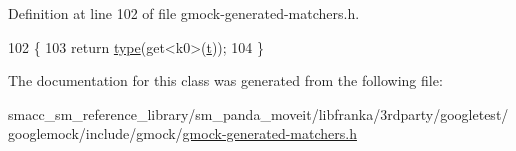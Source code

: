 Definition at line 102 of file gmock-\/generated-\/matchers.\+h.


\begin{DoxyCode}
102                                                 \{
103     \textcolor{keywordflow}{return} \hyperlink{classtesting_1_1internal_1_1TupleFields_3_01Tuple_00_01k0_00_01-1_00_01-1_00_01-1_00_01-1_00_01-d80da5b2d6dff94ddefe7f2fc2de778d_aeb08130cf9faa6f43e0453d2c6d9fd04}{type}(get<k0>(\hyperlink{namespacebattery__monitor__node_a7a63d20d1ea461e280f4eb5b47f925cd}{t}));
104   \}
\end{DoxyCode}


The documentation for this class was generated from the following file\+:\begin{DoxyCompactItemize}
\item 
smacc\+\_\+sm\+\_\+reference\+\_\+library/sm\+\_\+panda\+\_\+moveit/libfranka/3rdparty/googletest/googlemock/include/gmock/\hyperlink{gmock-generated-matchers_8h}{gmock-\/generated-\/matchers.\+h}\end{DoxyCompactItemize}
